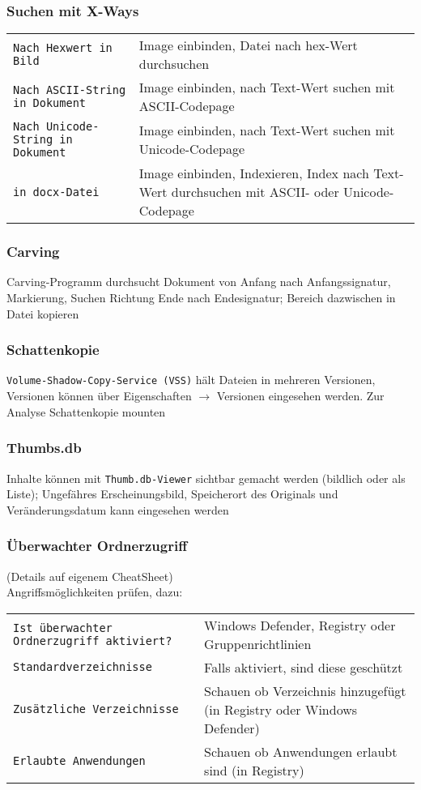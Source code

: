 \begin{multicols}{3}
\subsubsection{Suchen mit X-Ways}
\begin{tabular}{@{}p{\the\MyLen}%
		@{}p{\linewidth-\the\MyLen}@{}}
	\texttt{Nach Hexwert in Bild} & Image einbinden, Datei nach hex-Wert durchsuchen\\
	\texttt{Nach ASCII-String in Dokument} & Image einbinden, nach Text-Wert suchen mit ASCII-Codepage \\
	\texttt{Nach Unicode-String in Dokument} & Image einbinden, nach Text-Wert suchen mit Unicode-Codepage\\
	\texttt{in docx-Datei} & Image einbinden, Indexieren, Index nach Text-Wert durchsuchen mit ASCII- oder Unicode-Codepage
\end{tabular}

\subsubsection{Carving}
Carving-Programm durchsucht Dokument von Anfang nach Anfangssignatur, Markierung, Suchen Richtung Ende nach Endesignatur; Bereich dazwischen in Datei kopieren

\subsubsection{Schattenkopie}
\texttt{Volume-Shadow-Copy-Service (VSS)} hält Dateien in mehreren Versionen, Versionen können über Eigenschaften $\rightarrow$ Versionen eingesehen werden. Zur Analyse Schattenkopie mounten

\subsubsection{Thumbs.db}
Inhalte können mit \texttt{Thumb.db-Viewer} sichtbar gemacht werden (bildlich oder als Liste); Ungefähres Erscheinungsbild, Speicherort des Originals und Veränderungsdatum kann eingesehen werden

\subsubsection{Überwachter Ordnerzugriff}
(Details auf eigenem CheatSheet)\\
Angriffsmöglichkeiten prüfen, dazu:
\begin{tabular}{@{}p{\the\MyLen}%
		@{}p{\linewidth-\the\MyLen}@{}}
	\texttt{Ist überwachter Ordnerzugriff aktiviert?} &  Windows Defender, Registry oder Gruppenrichtlinien\\
	\texttt{Standardverzeichnisse} & Falls aktiviert, sind diese geschützt\\
	\texttt{Zusätzliche Verzeichnisse} & Schauen ob Verzeichnis hinzugefügt (in Registry oder Windows Defender)\\
	\texttt{Erlaubte Anwendungen} & Schauen ob Anwendungen erlaubt sind (in Registry)\\
\end{tabular}


\end{multicols}
